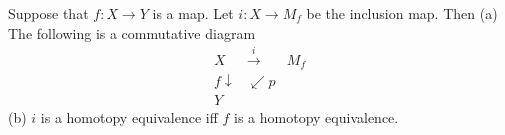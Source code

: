Suppose that $f: X \rightarrow Y$ is a map. Let $i: X \rightarrow M_f$ be the inclusion map. Then
(a) The following is a commutative diagram
$$\begin{array}{ccc}
X & \xrightarrow{i} & M_f \\
{\scriptstyle f}\downarrow & \swarrow{\scriptstyle p} & \\
Y & &
\end{array}$$
(b) $i$ is a homotopy equivalence iff $f$ is a homotopy equivalence.
